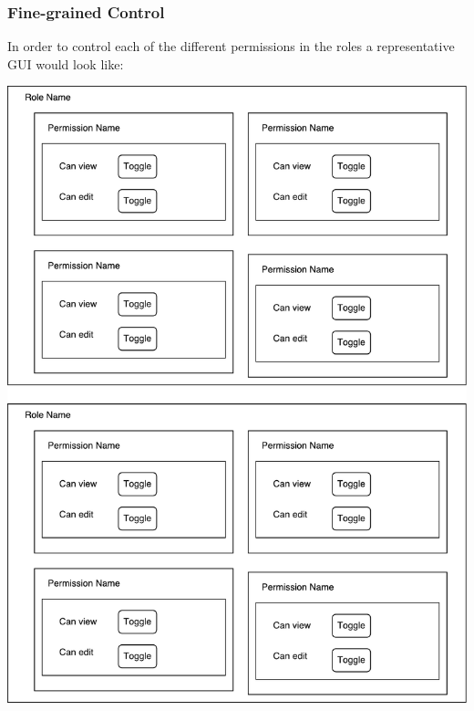 \documentclass{article}
\begin{document}
\subsubsection{Fine-grained Control}
\label{sub-sec:perm_control}
In order to control each of the different permissions in the roles a representative
GUI would look like: 

\includegraphics[width=\textwidth,height=\textheight,keepaspectratio]{figures/permissions.pdf}

\end{document}
